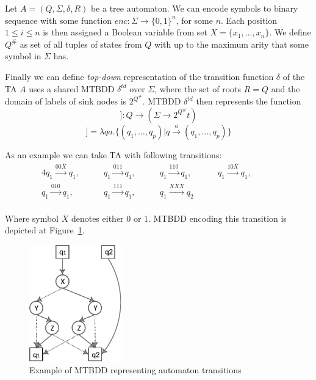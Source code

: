 \documentclass[a4paper, 12pt]{article}
\begin{document}
Let $A=(Q, \Sigma, \delta, R)$ be a tree automaton. We can encode symbols to binary sequence with some function $enc: \Sigma \rightarrow \{0, 1\}^n$, for some $n$. Each position $1\leq i \leq n$ is then assigned a Boolean variable from set $X = \{x_1, \dots, x_n\}$. We define $Q^\#$ as set of all tuples of states from $Q$ with up to the maximum arity that some symbol in $\Sigma$ has.

Finally we can define \textit{top-down} representation of the transition function $\delta$ of the TA $A$ uses a shared MTBDD $\delta^{td}$ over $\Sigma$, where the set of roots $R=Q$ and the domain of labels of sink nodes is $2^{Q^\#}$. MTBDD $\delta^{td}$ then represents the function
\begin{equation*}
[[ \delta^{td}]]  : Q \rightarrow (\Sigma \rightarrow 2^{Q^\#}t)
\end{equation*}
\begin{equation*}
[[ \delta^{td}]]   = \lambda q a . \{(q_1, \dots, q_p) | q \xrightarrow{a} (q_1, \dots, q_p) \} 
\end{equation*}

As an example we can take TA with following transitions:
\begin{alignat*}{4}
q_1 \xrightarrow{00\overline{X}} q_1, \qquad &
q_1 \xrightarrow{011} q_1, \qquad & 
q_1 \xrightarrow{110} q_1, \qquad &
q_1 \xrightarrow{10\overline{X}} q_1, \qquad & \\
q_1 \xrightarrow{010} q_1, \qquad &
q_1 \xrightarrow{111} q_1, \qquad &
q_1 \xrightarrow{\overline{X}\overline{X}\overline{X}} q_2 \qquad &  &\\
\end{alignat*}

Where symbol $\overline{X}$ denotes either 0 or 1. MTBDD encoding this transition is depicted at Figure~\ref{fig:MTBDD}.

\begin{figure}[h]
\centering
\includegraphics[width=4cm]{MTBDD}
\caption{Example of MTBDD representing automaton transitions \cite{fiedor:wsks}}
\label{fig:MTBDD}
\end{figure}
\end{document}
